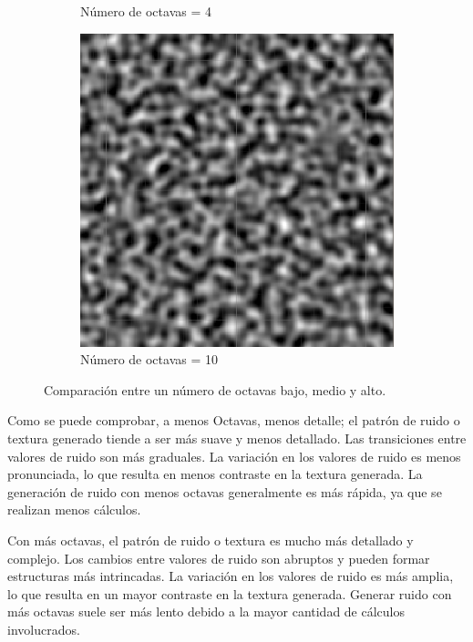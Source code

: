 \begin{figure}[ht]
\begin{subfigure}{0.3\linewidth}
        \caption{Número de octavas = 4 }
    \end{subfigure}
    \hfill
    \begin{subfigure}{0.3\linewidth}
        \centering
        \includegraphics[width=\linewidth]{img/codes/HeightOctaves.png}
        \caption{Número de octavas = 10}
    \end{subfigure}
    \caption{Comparación entre un número de octavas bajo, medio y alto.}
\end{figure}

Como se puede comprobar, a menos Octavas, menos detalle; el patrón de ruido o textura generado tiende a ser más suave y menos detallado. Las transiciones entre valores de ruido son más graduales.
La variación en los valores de ruido es menos pronunciada, lo que resulta en menos contraste en la textura generada. La generación de ruido con menos octavas generalmente es más rápida, ya que se realizan menos cálculos.

Con más octavas, el patrón de ruido o textura es mucho más detallado y complejo. Los cambios entre valores de ruido son abruptos y pueden formar estructuras más intrincadas.
La variación en los valores de ruido es más amplia, lo que resulta en un mayor contraste en la textura generada. Generar ruido con más octavas suele ser más lento debido a la mayor cantidad de cálculos involucrados.

